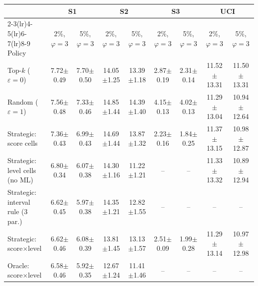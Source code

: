 \begin{tabular}{lcccccccc}
\toprule
 & \multicolumn{2}{c}{S1} & \multicolumn{2}{c}{S2} & \multicolumn{2}{c}{S3} & \multicolumn{2}{c}{UCI} \\
\cmidrule(lr){2-3}\cmidrule(lr){4-5}\cmidrule(lr){6-7}\cmidrule(lr){8-9}
Policy & 2\%, $\varphi{=}3$ & 5\%, $\varphi{=}3$ & 2\%, $\varphi{=}3$ & 5\%, $\varphi{=}3$ & 2\%, $\varphi{=}3$ & 5\%, $\varphi{=}3$ & 2\%, $\varphi{=}3$ & 5\%, $\varphi{=}3$ \\
\midrule
Top-$k$ ($\varepsilon{=}0$) & 7.72$\pm$0.49 & 7.70$\pm$0.50 & 14.05$\pm$1.25 & 13.39$\pm$1.18 & 2.87$\pm$0.19 & 2.31$\pm$0.14 & 11.52$\pm$13.31 & 11.50$\pm$13.31 \\
Random ($\varepsilon{=}1$) & 7.56$\pm$0.48 & 7.33$\pm$0.46 & 14.85$\pm$1.44 & 14.39$\pm$1.40 & 4.15$\pm$0.13 & 4.02$\pm$0.13 & 11.29$\pm$13.04 & 10.94$\pm$12.64 \\
\midrule
Strategic: score cells & 7.36$\pm$0.43 & 6.99$\pm$0.43 & 14.69$\pm$1.44 & 13.87$\pm$1.32 & 2.23$\pm$0.16 & 1.84$\pm$0.25 & 11.37$\pm$13.15 & 10.98$\pm$12.87 \\
Strategic: level cells (no ML) & 6.80$\pm$0.34 & 6.07$\pm$0.38 & 14.30$\pm$1.16 & 11.22$\pm$1.21 & -- & -- & 11.33$\pm$13.32 & 10.89$\pm$12.94 \\
Strategic: interval rule (3 par.) & 6.62$\pm$0.45 & 5.97$\pm$0.38 & 14.35$\pm$1.21 & 12.82$\pm$1.55 & -- & -- & -- & -- \\
Strategic: score$\times$level & 6.62$\pm$0.46 & 6.08$\pm$0.39 & 13.81$\pm$1.45 & 13.13$\pm$1.57 & 2.51$\pm$0.09 & 1.99$\pm$0.28 & 11.29$\pm$13.14 & 10.97$\pm$12.98 \\
Oracle: score$\times$level & 6.58$\pm$0.46 & 5.92$\pm$0.35 & 12.67$\pm$1.24 & 11.41$\pm$1.46 & -- & -- & -- & -- \\
\bottomrule
\end{tabular}

